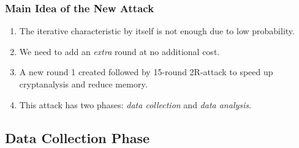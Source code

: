 \documentclass{beamer}
\begin{document}
    \begin{frame}
        \frametitle{Main Idea of the New Attack}
        \begin{enumerate}
            \item<1-> The iterative characteristic by itself is not enough due
            to low probability.
            \item<2-> We need to add an \emph{extra} round at no additional
            cost.
            \item<3-> A new round 1 created followed by 15-round 2R-attack to
            speed up cryptanalysis and reduce memory.
            \item<4-> This attack has two phases: \emph{data collection} and
            \emph{data analysis}.
        \end{enumerate}
    \end{frame}

    \subsection{Data Collection Phase}
    \label{subsec:data-collection}
\end{document}
